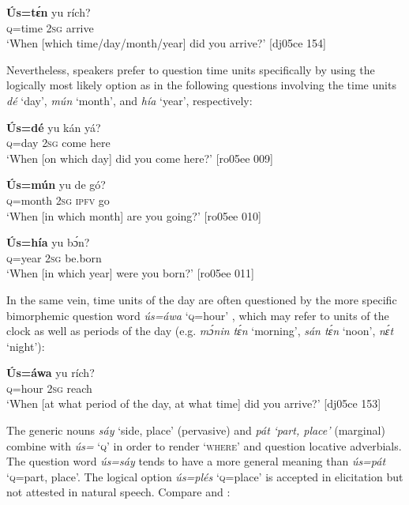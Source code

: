 \ea%
    \label{ex:key:622}
    \gll \textbf{\'{U}s=tɛ́n}  yu  rích?\\
\textsc{q}=time  \textsc{2sg}  arrive\\

\glt ‘When [which time/day/month/year] did you arrive?' [dj05ce 154]
\z

Nevertheless, speakers prefer to question time units specifically by using the logically most likely option as in the following questions involving the time units \textit{dé} ‘day’, \textit{mún} ‘month’, and \textit{hía} ‘year’, respectively: 


\ea%
    \label{ex:key:623}
    \gll \textbf{\'{U}s=dé}  yu  kán    yá?\\
\textsc{q}=day  \textsc{2sg}  come  here\\

\glt ‘When [on which day] did you come here?’ [ro05ee 009] 
\z


\ea%
    \label{ex:key:624}
    \gll \textbf{\'{U}s=mún}    yu  de  gó?\\
\textsc{q}=month    \textsc{2sg}  \textsc{ipfv}  go\\

\glt ‘When [in which month] are you going?’ [ro05ee 010]
\z


\ea%
    \label{ex:key:625}
    \gll \textbf{\'{U}s=hía}  yu  bɔ́n?\\
\textsc{q}=year  \textsc{2sg}  be.born\\

\glt ‘When [in which year] were you born?’ [ro05ee 011]
\z

In the same vein, time units of the day are often questioned by the more specific bimorphemic question word \textit{ús=áwa} ‘\textsc{q}=hour’ , which may refer to units of the clock as well as periods of the day (e.g. \textit{mɔ́nin tɛ́n} ‘morning’, \textit{sán tɛ́n} ‘noon’, \textit{nɛ́t} ‘night’):


\ea%
    \label{ex:key:626}
    \gll \textbf{\'{U}s=áwa}  yu  rích?\\
\textsc{q}=hour  \textsc{2sg}  reach\\

\glt ‘When [at what period of the day, at what time] did you arrive?’ [dj05ce 153]
\z

The generic nouns \textit{sáy} ‘side, place’ (pervasive) and \textit{pát} \textit{\textup{‘part, place’} }(marginal) combine with \textit{ús=} ‘\textsc{q}’ in order to render ‘\textsc{where’} and question locative adverbials. The question word \textit{ús=sáy} tends to have a more general meaning than \textit{ús=pát} ‘\textsc{q}=part, place’. The logical option \textit{ús=plés} ‘\textsc{q}=place’ is accepted in elicitation but not attested in natural speech. Compare  and :


